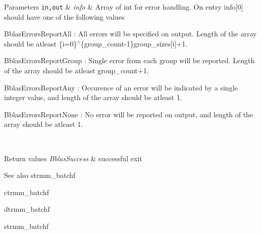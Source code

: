\begin{DoxyParams}[1]{Parameters}
\hline
\mbox{\tt in,out}  & {\em info} & Array of int for error handling. On entry info\mbox{[}0\mbox{]} should have one of the following values
\begin{DoxyItemize}
\item Bblas\+Errors\+Report\+All \+: All errors will be specified on output. Length of the array should be atleast \{i=0\}$^\wedge$\{group\+\_\+count-\/1\}group\+\_\+sizes\mbox{[}i\mbox{]}+1.
\item Bblas\+Errors\+Report\+Group \+: Single error from each group will be reported. Length of the array should be atleast group\+\_\+count+1.
\item Bblas\+Errors\+Report\+Any \+: Occurence of an error will be indicated by a single integer value, and length of the array should be atleast 1.
\item Bblas\+Errors\+Report\+None \+: No error will be reported on output, and length of the array should be atleast 1.
\end{DoxyItemize}\\
\hline
\end{DoxyParams}

\begin{DoxyRetVals}{Return values}
{\em Bblas\+Success} & successful exit\\
\hline
\end{DoxyRetVals}
\begin{DoxySeeAlso}{See also}
strmm\+\_\+batchf 

ctrmm\+\_\+batchf 

dtrmm\+\_\+batchf 

strmm\+\_\+batchf 
\end{DoxySeeAlso}
\mbox{\label{group__trmm__batchf_ga8649c49d5fcfc65a5cf0432fdf29660b}} 
